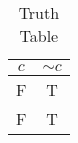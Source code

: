 \begin{table}[ht]
\caption{Truth Table}
\centering
\begin{tabular}{|c||c|}
\hline
$ c $ & $  \sim c $ \\
\hline
F & T \\
F & T \\
\hline
\end{tabular}
\label{table:tt1}
\end{table}

